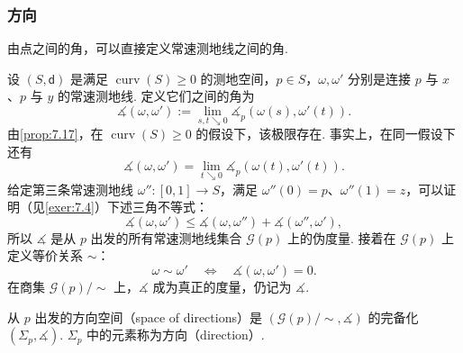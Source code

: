 \subsubsection{方向}\label{sec:7.3.2}
由点之间的角，可以直接定义常速测地线之间的角.

设 $(S,\mathsf d)$ 是满足 $\operatorname{curv}(S)\ge0$ 的测地空间，$p\in S$，$\omega,\omega'$ 分别是连接 $p$ 与 $x$、$p$ 与 $y$ 的常速测地线. 定义它们之间的角为
$$\measuredangle(\omega,\omega'):=\lim_{s,t\searrow0}\measuredangle_p(\omega(s),\omega'(t)).$$
由\autoref{prop:7.17}，在 $\operatorname{curv}(S)\ge0$ 的假设下，该极限存在. 事实上，在同一假设下还有
$$\measuredangle(\omega,\omega')=\lim_{t\searrow0}\measuredangle_p(\omega(t),\omega'(t)).$$
给定第三条常速测地线 $\omega'':[0,1]\to S$，满足 $\omega''(0)=p$、$\omega''(1)=z$，可以证明（见\autoref{exer:7.4}）下述三角不等式：
\begin{equation}\label{eq:7.12}
\measuredangle(\omega,\omega')\le\measuredangle(\omega,\omega'')+\measuredangle(\omega'',\omega'),
\end{equation}
所以 $\measuredangle$ 是从 $p$ 出发的所有常速测地线集合 $\mathcal G(p)$ 上的伪度量. 接着在 $\mathcal G(p)$ 上定义等价关系 $\sim$：
$$\omega\sim\omega'\quad\Longleftrightarrow\quad\measuredangle(\omega,\omega')=0.$$
在商集 $\mathcal G(p)/{\sim}$ 上，$\measuredangle$ 成为真正的度量，仍记为 $\measuredangle$.
\begin{definition}\label{def:7.18}
从 $p$ 出发的方向空间（space of directions）是 $(\mathcal G(p)/{\sim},\measuredangle)$ 的完备化 $(\Sigma_p,\measuredangle)$. $\Sigma_p$ 中的元素称为方向（direction）.
\end{definition}

